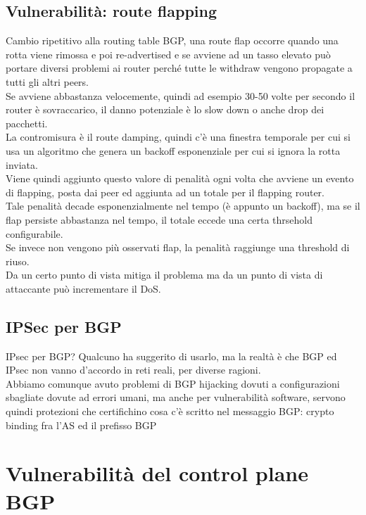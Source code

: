\documentclass[12pt, oneside]{extbook} %
\begin{document}
\subsection{Vulnerabilità: route flapping}
Cambio ripetitivo alla routing table BGP, una route flap occorre quando una rotta viene rimossa e poi re-advertised e se avviene ad un tasso elevato può portare diversi problemi ai router perché tutte le withdraw vengono propagate a tutti gli altri peers.
\\Se avviene abbastanza velocemente, quindi ad esempio 30-50 volte per secondo il router è sovraccarico, il danno potenziale è lo slow down o anche drop dei pacchetti.
\\La contromisura è il route damping, quindi c'è una finestra temporale per cui si usa un algoritmo che genera un backoff esponenziale per cui si ignora la rotta inviata.
\\Viene quindi aggiunto questo valore di penalità ogni volta che avviene un evento di flapping, posta dai peer ed aggiunta ad un totale per il flapping router.
\\Tale penalità decade esponenzialmente nel tempo (è appunto un backoff), ma se il flap persiste abbastanza nel tempo, il totale eccede una certa thrsehold configurabile.
\\Se invece non vengono più osservati flap, la penalità raggiunge una threshold di riuso.
\\Da un certo punto di vista mitiga il problema ma da un punto di vista di attaccante può incrementare il DoS.

\subsection{IPSec per BGP}
IPsec per BGP? Qualcuno ha suggerito di usarlo, ma la realtà è che BGP ed IPsec non vanno d'accordo in reti reali, per diverse ragioni.
\\Abbiamo comunque avuto problemi di BGP hijacking dovuti a configurazioni sbagliate dovute ad errori umani, ma anche per vulnerabilità software, servono quindi protezioni che certifichino cosa c'è scritto nel messaggio BGP: crypto binding fra l'AS ed il prefisso BGP


\section{Vulnerabilità del control plane BGP}
\end{document}
